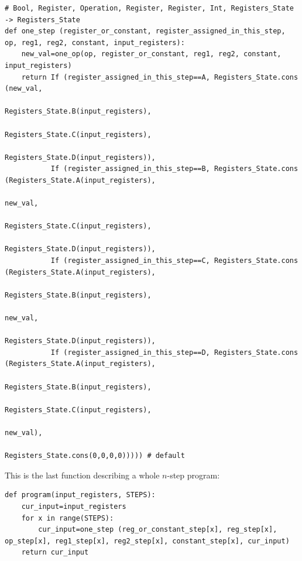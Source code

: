 \begin{lstlisting}
# Bool, Register, Operation, Register, Register, Int, Registers_State -> Registers_State
def one_step (register_or_constant, register_assigned_in_this_step, op, reg1, reg2, constant, input_registers):
    new_val=one_op(op, register_or_constant, reg1, reg2, constant, input_registers)
    return If (register_assigned_in_this_step==A, Registers_State.cons (new_val,
                                                                        Registers_State.B(input_registers), 
                                                                        Registers_State.C(input_registers), 
                                                                        Registers_State.D(input_registers)),
           If (register_assigned_in_this_step==B, Registers_State.cons (Registers_State.A(input_registers), 
                                                                        new_val,
                                                                        Registers_State.C(input_registers),
                                                                        Registers_State.D(input_registers)), 
           If (register_assigned_in_this_step==C, Registers_State.cons (Registers_State.A(input_registers), 
                                                                        Registers_State.B(input_registers), 
                                                                        new_val,
                                                                        Registers_State.D(input_registers)), 
           If (register_assigned_in_this_step==D, Registers_State.cons (Registers_State.A(input_registers), 
                                                                        Registers_State.B(input_registers), 
                                                                        Registers_State.C(input_registers), 
                                                                        new_val),
                                                  Registers_State.cons(0,0,0,0))))) # default
\end{lstlisting}

This is the last function describing a whole $n$-step program:

\begin{lstlisting}
def program(input_registers, STEPS):
    cur_input=input_registers
    for x in range(STEPS):
        cur_input=one_step (reg_or_constant_step[x], reg_step[x], op_step[x], reg1_step[x], reg2_step[x], constant_step[x], cur_input)
    return cur_input
\end{lstlisting}


